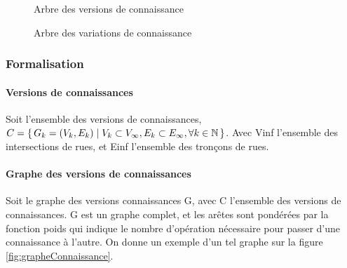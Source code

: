 \documentclass[a4paper]{article}
\DeclareMathOperator{\diff}{diff}
\newcommand{\N}{\mathbb{N}}
\begin{document}
\begin{figure}
  \centering
  \caption{Arbre des versions de connaissance}
  \label{fig:arbreConnaissance}
\end{figure}

\begin{figure}
  \centering
  \caption{Arbre des variations de connaissance}
  \label{fig:arbreModifConnaissance}
\end{figure}

    \subsubsection{Formalisation}

\paragraph{Versions de connaissances} Soit l'ensemble des versions de
connaissances, $C = \set{G_k = (V_k, E_k) | V_k \subset V_\infty, E_k \subset
E_\infty, \forall k \in \N}$. Avec \gls{Vinf} l'ensemble des intersections de
rues, et \gls{Einf} l'ensemble des tronçons de rues.

\paragraph{Graphe des versions de connaissances} Soit le graphe des versions
connaissances \gls{G}, avec \gls{C} l'ensemble des versions de connaissances.
\gls{G} est un graphe complet, et les arêtes sont pondérées par la fonction
\gls{poids} qui indique le nombre d'opération nécessaire pour passer d'une
connaissance à l'autre. On donne un exemple d'un tel graphe sur la figure
\ref{fig:grapheConnaissance}.
\end{document}
